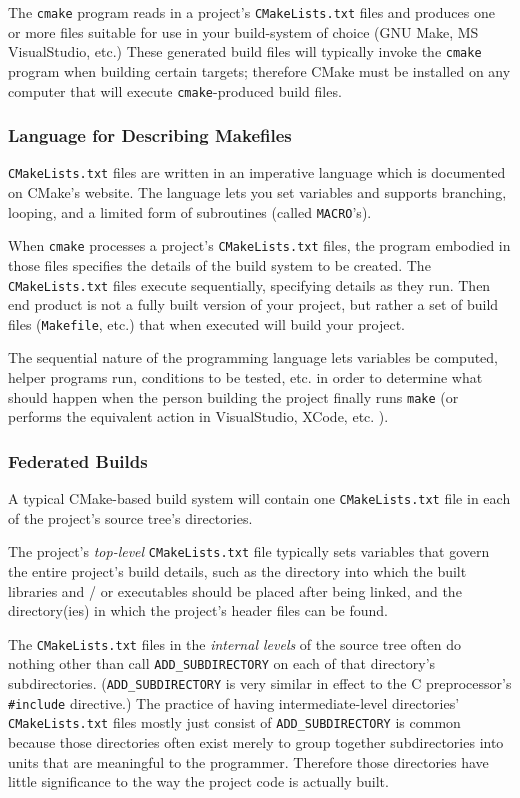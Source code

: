 \documentclass[letterpaper,10pt]{article}
\begin{document}
The \verb|cmake| program reads in a project's \verb|CMakeLists.txt| files and produces
one or more files suitable for use in your build-system of choice (GNU Make, 
MS VisualStudio, etc.)  These generated build files will typically invoke the
\verb|cmake| program when building certain targets; therefore CMake must be installed
on any computer that will execute \verb|cmake|-produced build files.

\subsubsection{Language for Describing Makefiles}
\verb|CMakeLists.txt| files are written in an imperative language which is
documented on CMake's website.  The language lets you set variables and
supports branching, looping, and a limited form of subroutines (called
\verb|MACRO|'s).

When \verb|cmake| processes a project's \verb|CMakeLists.txt| files, the program
embodied in those files specifies the details of the build system to be created.
The \verb|CMakeLists.txt| files execute sequentially, specifying details as they
run.  Then end product is not a fully built version of your project, but rather
a set of build files (\verb|Makefile|, etc.) that when executed will build your
project.

The sequential nature of the programming language lets variables be computed,
helper programs run, conditions to be tested, etc. in order to determine what should
happen when the person building the project finally runs \verb|make| (or performs the
equivalent action in VisualStudio, XCode, etc. ).

\subsubsection{Federated Builds}
A typical CMake-based build system will contain one \verb|CMakeLists.txt| file
in each of the project's source tree's directories.  

The project's \textit{top-level} \verb|CMakeLists.txt| file typically sets variables that
govern the entire project's build details, such as the directory into which 
the built libraries and / or executables should be placed after being linked, and
the directory(ies) in which the project's header files can be found.

The \verb|CMakeLists.txt| files
in the \textit{internal levels} of the source tree often do nothing other than call
\verb|ADD_SUBDIRECTORY| on each of that directory's subdirectories.
(\verb|ADD_SUBDIRECTORY| is very
similar in effect to the C preprocessor's \verb|#include| directive.)
The practice of having intermediate-level directories' \verb|CMakeLists.txt|
files mostly just consist of \verb|ADD_SUBDIRECTORY| is common because
those directories often exist merely to group together 
subdirectories into units that are meaningful to the programmer.
Therefore those directories have little significance to the way the 
project code is actually built.
\end{document}
